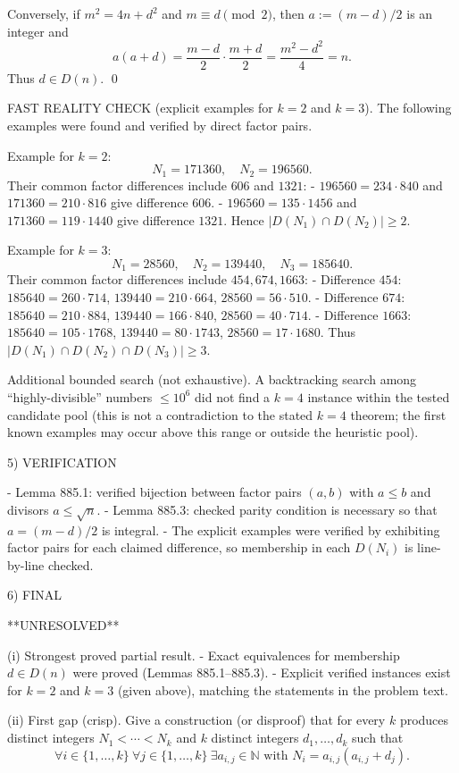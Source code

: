 Conversely, if $m^2=4n+d^2$ and $m\equiv d\pmod2$, then $a:=(m-d)/2$ is an integer and
\[a(a+d)=\frac{m-d}{2}\cdot\frac{m+d}{2}=\frac{m^2-d^2}{4}=n.
\]
Thus $d\in D(n)$. \qed

FAST REALITY CHECK (explicit examples for $k=2$ and $k=3$).
The following examples were found and verified by direct factor pairs.

Example for $k=2$:
\[N_1=171360,\quad N_2=196560.
\]
Their common factor differences include $606$ and $1321$:
- $196560=234\cdot 840$ and $171360=210\cdot 816$ give difference $606$.
- $196560=135\cdot 1456$ and $171360=119\cdot 1440$ give difference $1321$.
Hence $|D(N_1)\cap D(N_2)|\ge 2$.

Example for $k=3$:
\[N_1=28560,\quad N_2=139440,\quad N_3=185640.
\]
Their common factor differences include $454,674,1663$:
- Difference $454$:
  $185640=260\cdot 714$, $139440=210\cdot 664$, $28560=56\cdot 510$.
- Difference $674$:
  $185640=210\cdot 884$, $139440=166\cdot 840$, $28560=40\cdot 714$.
- Difference $1663$:
  $185640=105\cdot 1768$, $139440=80\cdot 1743$, $28560=17\cdot 1680$.
Thus $|D(N_1)\cap D(N_2)\cap D(N_3)|\ge 3$.

Additional bounded search (not exhaustive).
A backtracking search among “highly-divisible” numbers $\le 10^6$ did not find a $k=4$ instance within the tested candidate pool (this is not a contradiction to the stated $k=4$ theorem; the first known examples may occur above this range or outside the heuristic pool).

5) VERIFICATION

- Lemma 885.1: verified bijection between factor pairs $(a,b)$ with $a\le b$ and divisors $a\le \sqrt n$.
- Lemma 885.3: checked parity condition is necessary so that $a=(m-d)/2$ is integral.
- The explicit examples were verified by exhibiting factor pairs for each claimed difference, so membership in each $D(N_i)$ is line-by-line checked.

6) FINAL

**UNRESOLVED**

(i) Strongest proved partial result.
- Exact equivalences for membership $d\in D(n)$ were proved (Lemmas 885.1--885.3).
- Explicit verified instances exist for $k=2$ and $k=3$ (given above), matching the statements in the problem text.

(ii) First gap (crisp).
Give a construction (or disproof) that for every $k$ produces distinct integers $N_1<\cdots<N_k$ and $k$ distinct integers $d_1,\dots,d_k$ such that
\[\forall i\in\{1,\dots,k\}\ \forall j\in\{1,\dots,k\}\ \exists a_{i,j}\in\mathbb N\text{ with }N_i=a_{i,j}(a_{i,j}+d_j).\]

